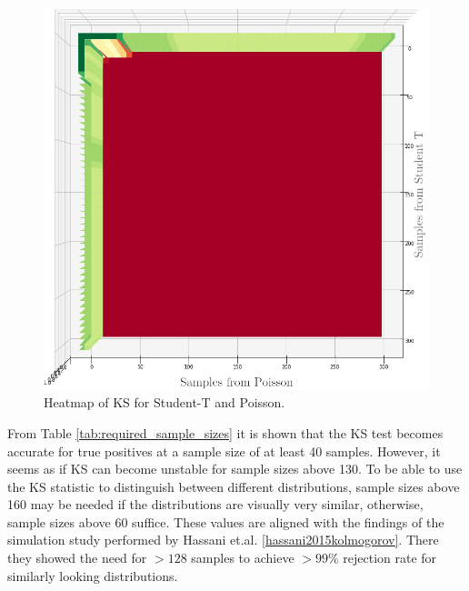 \begin{figure}[h]
  \centering
  \includegraphics[width=\linewidth]{./img/hypothesis_test/deepar_heatmap_Y_student_t_X_poisson_ks_edited.png}
  \endminipage
  \caption{Heatmap of KS for Student-T and Poisson.}
  \label{ks_student_t_poisson}
\end{figure}
\clearpage

From Table \ref{tab:required_sample_sizes} it is shown that the KS test becomes accurate for true positives at a sample size of at least 40 samples. However, it seems as if KS can become unstable for sample sizes above 130. To be able to use the KS statistic to distinguish between different distributions, sample sizes above 160 may be needed if the distributions are visually very similar, otherwise, sample sizes above \(60\) suffice. These values are aligned with the findings of the simulation study performed by Hassani et.al. \ref{hassani2015kolmogorov}. There they showed the need for \(>128\) samples to achieve \(>99\)\% rejection rate for similarly looking distributions.

